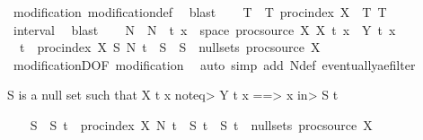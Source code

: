 \begin{isabellebody}
\ modification\ modification{\isacharunderscore}{\kern0pt}def\ \isamarkupfalse%
\ blast\isanewline
\ \ \isamarkupfalse%
\ T\ \ T{\isacharcolon}{\kern0pt}\ {\isachardoublequoteopen}proc{\isacharunderscore}{\kern0pt}index\ X\ {\isacharequal}{\kern0pt}\ {\isacharbraceleft}{\kern0pt}{}{\isachardot}{\kern0pt}{\isachardot}{\kern0pt}T{\isacharbraceright}{\kern0pt}{\isachardoublequoteclose}\ {\isachardoublequoteopen}T\ {\isachargreater}{\kern0pt}\ {}{\isachardoublequoteclose}\isanewline
\ \ \ \ \isamarkupfalse%
\ interval\ \isamarkupfalse%
\ blast\isanewline
\ \ \isamarkupfalse%
\ N\ \ {\isachardoublequoteopen}N\ {\isasymequiv}\ {\isasymlambda}t{\isachardot}{\kern0pt}\ {\isacharbraceleft}{\kern0pt}x\ {\isasymin}\ space\ {\isacharparenleft}{\kern0pt}proc{\isacharunderscore}{\kern0pt}source\ X{\isacharparenright}{\kern0pt}{\isachardot}{\kern0pt}\ X\ t\ x\ {\isasymnoteq}\ Y\ t\ x{\isacharbraceright}{\kern0pt}{\isachardoublequoteclose}\isanewline
\ \ \isamarkupfalse%
\ {}{\isacharcolon}{\kern0pt}\ {\isachardoublequoteopen}{\isasymforall}t\ {\isasymin}\ proc{\isacharunderscore}{\kern0pt}index\ X{\isachardot}{\kern0pt}\ {\isasymexists}S{\isachardot}{\kern0pt}\ N\ t\ {\isasymsubseteq}\ S\ {\isasymand}\ S\ {\isasymin}\ null{\isacharunderscore}{\kern0pt}sets\ {\isacharparenleft}{\kern0pt}proc{\isacharunderscore}{\kern0pt}source\ X{\isacharparenright}{\kern0pt}{\isachardoublequoteclose}\isanewline
\ \ \ \ \isamarkupfalse%
\ modificationD{\isacharparenleft}{\kern0pt}{}{\isacharparenright}{\kern0pt}{\isacharbrackleft}{\kern0pt}OF\ modification{\isacharbrackright}{\kern0pt}\ \isamarkupfalse%
\ {\isacharparenleft}{\kern0pt}auto\ simp\ add{\isacharcolon}{\kern0pt}\ N{\isacharunderscore}{\kern0pt}def\ eventually{\isacharunderscore}{\kern0pt}ae{\isacharunderscore}{\kern0pt}filter{\isacharparenright}{\kern0pt}%
\begin{isamarkuptext}%
S is a null set such that X t x \<noteq> Y t x ==> x \<in> S t%
\end{isamarkuptext}\isamarkuptrue%
\ \ \isamarkupfalse%
\ S\ \ S{\isacharcolon}{\kern0pt}\ {\isachardoublequoteopen}{\isasymforall}t\ {\isasymin}\ proc{\isacharunderscore}{\kern0pt}index\ X{\isachardot}{\kern0pt}\ N\ t\ {\isasymsubseteq}\ S\ t\ {\isasymand}\ S\ t\ {\isasymin}\ null{\isacharunderscore}{\kern0pt}sets\ {\isacharparenleft}{\kern0pt}proc{\isacharunderscore}{\kern0pt}source\ X{\isacharparenright}{\kern0pt}{\isachardoublequoteclose}\isanewline

\end{isabellebody}
